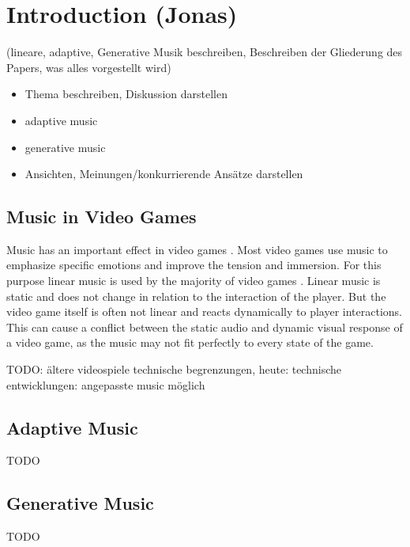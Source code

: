 \section{Introduction (Jonas)}
(lineare, adaptive, Generative Musik beschreiben, Beschreiben der Gliederung des Papers, was alles vorgestellt wird)
\begin{itemize}
    \item Thema beschreiben, Diskussion darstellen
    \item adaptive music
    \item generative music
    \item Ansichten, Meinungen/konkurrierende Ansätze darstellen
\end{itemize}


\subsection{Music in Video Games}
Music has an important effect in video games \cite{fu2015backgroundmusic}. Most video games use music to emphasize specific emotions and improve the tension and immersion. For this purpose linear music is used by the majority of video games \cite{prechtl2016adaptive}. Linear music is static and does not change in relation to the interaction of the player. But the video game itself is often not linear and reacts dynamically to player interactions. This can cause a conflict between the static audio and dynamic visual response of a video game, as the music may not fit perfectly to every state of the game.  

TODO: ältere videospiele technische begrenzungen, heute: technische entwicklungen: angepasste music möglich

\subsection{Adaptive Music}
TODO

\subsection{Generative Music}
TODO
